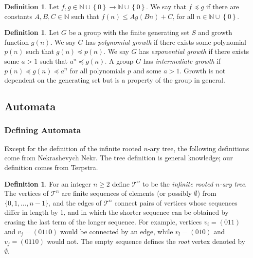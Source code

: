 \documentclass[11pt]{amsart}
\theoremstyle{definition}
\newtheorem{definition}[theorem]{Definition}
\theoremstyle{remark}
\numberwithin{equation}{section}
\begin{document}
\begin{definition}
Let $f,g\in \mathbb{N}\cup \left\{0\right\} \rightarrow \mathbb{N}\cup \left\{0\right\} $. We say that $f\preceq g$ if there are constants $A,B,C \in \mathbb{N}$ such that $f(n)\leq Ag(Bn)+C$, for all $n \in \mathbb{N} \cup \left\{0\right\}$.
\end{definition}

\begin{definition}
Let $G$ be a group with the finite generating set $S$ and growth function $g(n)$.  We say $G$ has \textit{polynomial growth} if there exists some polynomial $p(n)$ such that $g(n)\preceq p(n)$.  We say $G$ has \textit{exponential growth} if there exists some $a> 1$ such that $a^n\preceq g(n)$. A group $G$ has \textit{intermediate growth} if $p(n)\preceq g(n) \preceq a^n$ for all polynomials $p$ and some $a > 1$. Growth is not dependent on the generating set but is a property of the group in general.
\end{definition}




\subsection{Automata}

\subsubsection{Defining Automata}

\indent Except for the definition of the infinite rooted $n$-ary tree, the following definitions come from Nekrashevych
{Nekr}. The tree definition is general knowledge; our definition comes from Terpstra\cite{Terp}.

\begin{definition}
For an integer $n \geq 2$ define $\mathcal{T}^n$ to be the \textit{infinite rooted $n$-ary tree}. The vertices of $\mathcal{T}^n$ are finite sequences of elements (or possibly $\emptyset$) from $\{0,1,\ldots,n - 1\}$, and the edges of $\mathcal{T}^n$ connect pairs of vertices whose sequences differ in length by $1$, and in which the shorter sequence can be obtained by erasing the last term of the longer sequence. For example, vertices $v_i = (011)$ and $v_j = (0110)$ would be connected by an edge, while $v_l = (010)$ and $v_j=(0110)$ would not. The empty sequence defines the \textit{root} vertex denoted by $\emptyset$.
\end{definition}
\end{document}
